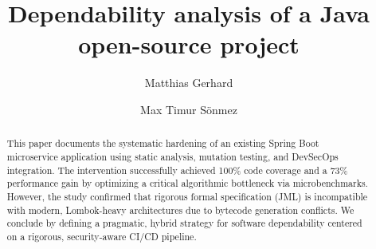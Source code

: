 
\acmDOI{}
\acmISBN{}

\title{Dependability analysis of a Java open-source project}

\author{Matthias Gerhard}

\author{Max Timur Sönmez}

\renewcommand{\shortauthors}{M. Gerhard and M. Sönmez}

\begin{abstract}
    This paper documents the systematic hardening of an existing Spring Boot microservice application using static analysis, mutation testing, and DevSecOps integration. The intervention successfully achieved 100\% code coverage and a 73\% performance gain by optimizing a critical algorithmic bottleneck via microbenchmarks. However, the study confirmed that rigorous formal specification (JML) is incompatible with modern, Lombok-heavy architectures due to bytecode generation conflicts. We conclude by defining a pragmatic, hybrid strategy for software dependability centered on a rigorous, security-aware CI/CD pipeline.
\end{abstract}


\usepackage{graphicx}
\usepackage{booktabs}
\usepackage[htt]{hyphenat}

\newcommand{\repourl}{\texttt{ecommerce-api-spring-kafka}}